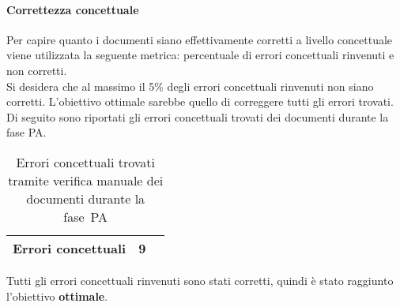 \documentclass[../PianoDiQualifica.tex]{subfiles}
\begin{document}
\begin{appendices}
			\paragraph{Correttezza concettuale}
			Per capire quanto i documenti siano effettivamente corretti a livello concettuale viene utilizzata la seguente metrica: percentuale di errori concettuali rinvenuti e non corretti.\\
			Si desidera che al massimo il 5\% degli errori concettuali rinvenuti non siano corretti. L'obiettivo ottimale sarebbe quello di correggere tutti gli errori trovati. \\
			Di seguito sono riportati gli errori concettuali trovati dei documenti durante la fase PA.
			\begin{table}[H]
				\centering
				\begin{tabular}{l * {2}{c}}
					\midrule
					Errori concettuali & 9 \\
					\midrule
				\end{tabular}
				\caption{Errori concettuali trovati tramite verifica manuale dei documenti durante la fase\g\ PA}
				\label{tab:errori_concettuali}
			\end{table}
			Tutti gli errori concettuali rinvenuti sono stati corretti, quindi è stato raggiunto l'obiettivo \textbf{ottimale}.
			
\end{appendices}
\end{document}

